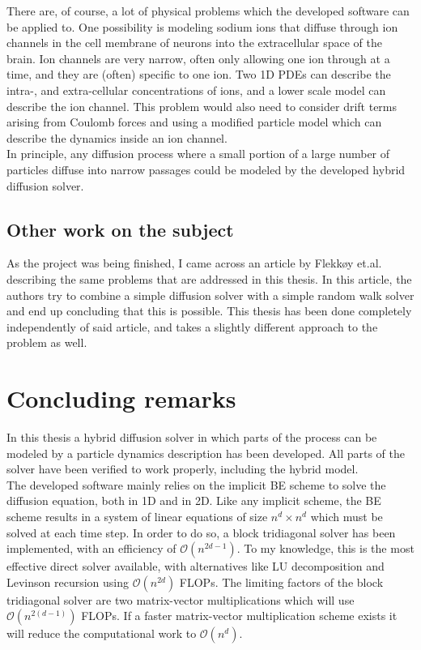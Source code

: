 There are, of course, a lot of physical problems which the developed software can be applied to. 
One possibility is modeling sodium ions that diffuse through ion channels in the cell membrane of neurons into the extracellular space of the brain. 
Ion channels are very narrow, often only allowing one ion through at a time, and they are (often) specific to one ion. 
Two 1D PDEs can describe the intra-, and extra-cellular concentrations of ions, and a lower scale model can describe the ion channel. 
This problem would also need to consider drift terms arising from Coulomb forces and using a modified particle model which can describe the dynamics inside an ion channel. \\

In principle, any diffusion process where a small portion of a large number of particles diffuse into narrow passages could be modeled by the developed hybrid diffusion solver.

\subsection{Other work on the subject}

As the project was being finished, I came across an article by Flekkøy et.al.\cite{flekkoy2001coupling} describing the same problems that are addressed in this thesis. 
In this article, the authors try to combine a simple diffusion solver with a simple random walk solver and end up concluding that this is possible. 
This thesis has been done completely independently of said article, and takes a slightly different approach to the problem as well. \\



\section{Concluding remarks}

In this thesis a hybrid diffusion solver in which parts of the process can be modeled by a particle dynamics description has been developed. 
All parts of the solver have been verified to work properly, including the hybrid model. \\


The developed software mainly relies on the implicit BE scheme to solve the diffusion equation, both in 1D and in 2D. 
Like any implicit scheme, the BE scheme results in a system of linear equations of size $n^d\times n^d$ which must be solved at each time step. 
In order to do so, a block tridiagonal solver has been implemented, with an efficiency of $\mathcal{O}(n^{2d-1})$. 
To my knowledge, this is the most effective direct solver available, with alternatives like LU decomposition and Levinson recursion using $\mathcal{O}(n^{2d})$ FLOPs. 
The limiting factors of the block tridiagonal solver are two matrix-vector multiplications which will use $\mathcal{O}(n^{2(d-1)})$ FLOPs. 
If a faster matrix-vector multiplication scheme exists it will reduce the computational work to $\mathcal{O}(n^d)$. \\


